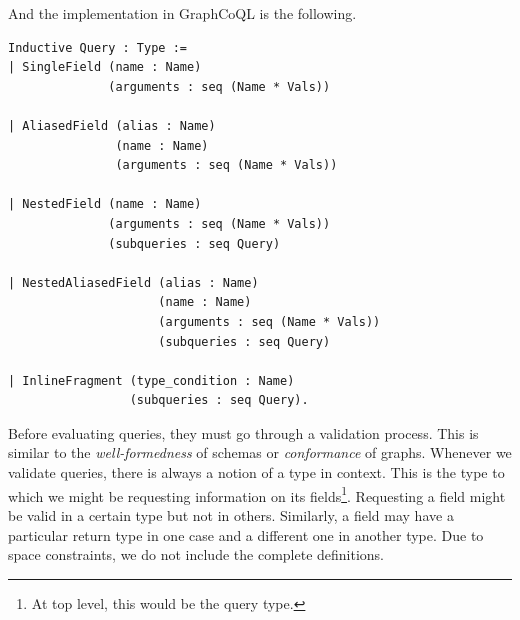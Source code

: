 And the implementation in GraphCoQL is the following.

\begin{verbatim}
Inductive Query : Type :=
| SingleField (name : Name)
              (arguments : seq (Name * Vals))
            
| AliasedField (alias : Name)
               (name : Name)
               (arguments : seq (Name * Vals))
             
| NestedField (name : Name)
              (arguments : seq (Name * Vals))
              (subqueries : seq Query)
            
| NestedAliasedField (alias : Name)
                     (name : Name)
                     (arguments : seq (Name * Vals))
                     (subqueries : seq Query)

| InlineFragment (type_condition : Name)
                 (subqueries : seq Query).
\end{verbatim}


Before evaluating queries, they must go through a validation process. This is similar to the \textit{well-formedness} of schemas or \textit{conformance} of graphs. Whenever we validate queries, there is always a notion of a type in context. This is the type to which we might be requesting information on its fields\footnote{At top level, this would be the query type.}. Requesting a field might be valid in a certain type but not in others. Similarly, a field may have a particular return type in one case and a different one in another type. Due to space constraints, we do not include the complete definitions.

